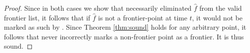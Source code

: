 \begin{proof}
Since in both cases we show that \FFD necessarily eliminated $\hat{f}$ from the
valid frontier list, it follows that if $\hat{f}$ is not a frontier-point at time $t$, it would not
be marked as such by \FFD.
Since Theorem \ref{thm:sound} holds for any arbitrary point, it follows that
\FFD never incorrectly marks a non-frontier point as a frontier. It is thus
sound.
\end{proof}
